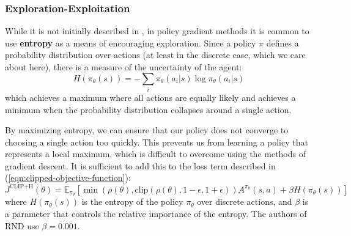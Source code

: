\documentclass[journal, onecolumn, 12pt, draftclsnofoot]{IEEEtran}
\newcommand{\kword}[1]{\textbf{#1}}
\begin{document}
	\subsubsection{Exploration-Exploitation}
	\par While it is not initially described in \cite{ppo}, in policy gradient methods it is common to use \kword{entropy} as a means of encouraging exploration. Since a policy $\pi$ defines a probability distribution over actions (at least in the discrete case, which we care about here), there is a measure of the uncertainty of the agent:
	\begin{equation}
		\label{eqn:entropy}
		H(\pi_\theta(s)) = -\sum_i \pi_\theta(a_i \vert s) \log \pi_\theta(a_i \vert s)
	\end{equation}
	which achieves a maximum where all actions are equally likely and achieves a minimum when the probability distribution collapses around a single action.
	\par By maximizing entropy, we can ensure that our policy does not converge to choosing a single action too quickly. This prevents us from learning a policy that represents a local maximum, which is difficult to overcome using the methods of gradient descent. It is sufficient to add this to the loss term described in (\ref{eqn:clipped-objective-function}):
	\begin{equation}
		\label{eqn:clipped-objective-function-with-entropy}
		J^\text{CLIP+H}(\theta) = \mathbb{E}_{\pi_\theta} \left[ \min \left( \rho(\theta), \text{clip} (\rho(\theta), 1-\epsilon, 1+\epsilon) \right)  A^{\pi_\theta}(s,a)  + \beta H(\pi_\theta(s)) \right]
	\end{equation}
	where $H(\pi_\theta(s))$ is the entropy of the policy $\pi_\theta$ over discrete actions, and $\beta$ is a parameter that controls the relative importance of the entropy. The authors of RND use $\beta = 0.001$.
\end{document}
